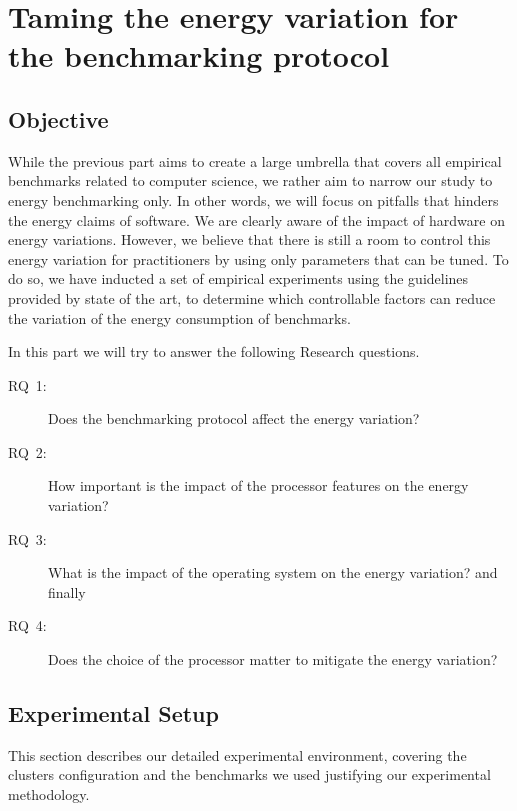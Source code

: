 
\section{Taming the energy variation for the benchmarking protocol}

\subsection{Objective}
While the previous part aims to create a large umbrella that covers all empirical benchmarks related to computer science, we rather aim to narrow our study to energy benchmarking only.
In other words, we will focus on pitfalls that hinders the energy claims of software.
We are clearly aware of the impact of hardware on energy variations.
However, we believe that there is still a room to control this energy variation for practitioners by using only parameters that can be tuned.
To do so, we have inducted a set of empirical experiments using the guidelines provided by state of the art, to determine which controllable factors can reduce the variation of the energy consumption of benchmarks.

In this part we will try to answer the following Research questions.

\begin{description}
    \item[\textsc{RQ}~1:] Does the benchmarking protocol affect the energy variation?
    \item[\textsc{RQ}~2:] How important is the impact of the processor features on the energy variation?
    \item[\textsc{RQ}~3:] What is the impact of the operating system on the energy variation? and finally
    \item[\textsc{RQ}~4:] Does the choice of the processor matter to mitigate the energy variation?
\end{description}


\subsection{Experimental Setup}\label{subsec:setup}
This section describes our detailed experimental environment, covering the clusters configuration and the benchmarks we used  justifying our experimental methodology.

